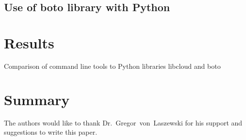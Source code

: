 \subsection{Use of boto library with Python}

\section{Results}

Comparison of command line tools to Python libraries libcloud and boto

\section{Summary}

\begin{acks}

  The authors would like to thank Dr.~Gregor~von~Laszewski for his
  support and suggestions to write this paper.

\end{acks}


 

